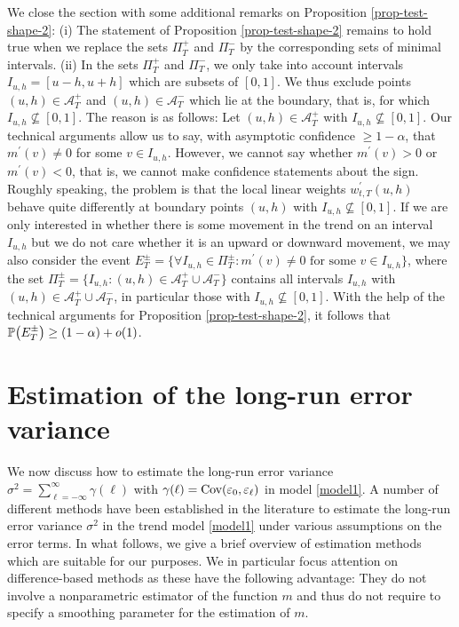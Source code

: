 We close the section with some additional remarks on Proposition \ref{prop-test-shape-2}: (i) The statement of Proposition \ref{prop-test-shape-2} remains to hold true when we replace the sets $\Pi_T^+$ and $\Pi_T^-$ by the corresponding sets of minimal intervals. (ii) In the sets $\Pi_T^+$ and $\Pi_T^-$, we only take into account intervals $I_{u,h} = [u-h,u+h]$ which are subsets of $[0,1]$. We thus exclude points $(u,h) \in \mathcal{A}_T^+$ and $(u,h) \in \mathcal{A}_T^-$ which lie at the boundary, that is, for which $I_{u,h} \nsubseteq [0,1]$. The reason is as follows: Let $(u,h) \in \mathcal{A}_T^+$ with $I_{u,h} \nsubseteq [0,1]$. Our technical arguments allow us to say, with asymptotic confidence $\ge 1 - \alpha$, that $m^\prime(v) \ne 0$ for some $v \in I_{u,h}$. However, we cannot say whether $m^\prime(v) > 0$ or $m^\prime(v) < 0$, that is, we cannot make confidence statements about the sign. Roughly speaking, the problem is that the local linear weights $w_{t,T}^\prime(u,h)$ behave quite differently at boundary points $(u,h)$ with $I_{u,h} \nsubseteq [0,1]$. If we are only interested in whether there is some movement in the trend on an interval $I_{u,h}$ but we do not care whether it is an upward or downward movement, we may also consider the event $E_T^\pm = \{ \forall I_{u,h} \in \Pi_T^\pm: m^\prime(v) \ne 0 \text{ for some } v \in I_{u,h} \}$, where the set $\Pi_T^\pm = \{ I_{u,h}: (u,h) \in \mathcal{A}_T^+ \cup \mathcal{A}_T^- \}$ contains all intervals $I_{u,h}$ with $(u,h) \in \mathcal{A}_T^+ \cup \mathcal{A}_T^-$, in particular those with $I_{u,h} \nsubseteq [0,1]$. With the help of the technical arguments for Proposition \ref{prop-test-shape-2}, it follows that $\mathbb{P} \big( E_T^\pm \big) \ge (1-\alpha) + o(1)$.



\section{Estimation of the long-run error variance}\label{sec-error-var}


We now discuss how to estimate the long-run error variance $\sigma^2 = \sum\nolimits_{\ell=-\infty}^{\infty} \gamma(\ell)$ with $\gamma(\ell) = \textnormal{Cov}(\varepsilon_0,\varepsilon_{\ell})$ in model \eqref{model1}. A number of different methods have been established in the literature to estimate the long-run error variance $\sigma^2$ in the trend model \eqref{model1} under various assumptions on the error terms. In what follows, we give a brief overview of estimation methods which are suitable for our purposes. We in particular focus attention on difference-based methods as these have the following advantage: They do not involve a nonparametric estimator of the function $m$ and thus do not require to specify a smoothing parameter for the estimation of $m$. 


